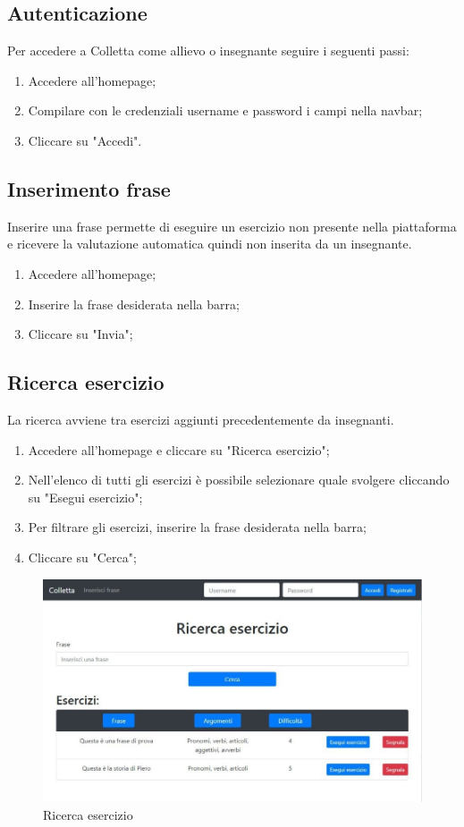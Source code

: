 \documentclass[11pt,a4paper]{article}
\begin{document}
{	\subsection{Autenticazione}
	Per accedere a Colletta come allievo o insegnante seguire i seguenti passi:
	\begin{enumerate}
		\item Accedere all'homepage;
		\item Compilare con le credenziali username e password i campi nella navbar;
		\item Cliccare su "Accedi".
	\end{enumerate}

	\subsection{Inserimento frase}
	Inserire una frase permette di eseguire un esercizio non presente nella piattaforma e ricevere la valutazione automatica quindi non inserita da un insegnante.	
	\begin{enumerate}
		\item Accedere all'homepage;
		\item Inserire la frase desiderata nella barra;
		\item Cliccare su "Invia";
	\end{enumerate}

	\subsection{Ricerca esercizio}
	La ricerca avviene tra esercizi aggiunti precedentemente da insegnanti. 
	
	\begin{enumerate}
		\item Accedere all'homepage e cliccare su "Ricerca esercizio";
		\item Nell'elenco di tutti gli esercizi è possibile selezionare quale svolgere cliccando su "Esegui esercizio";
		\item Per filtrare gli esercizi, inserire la frase desiderata nella barra;
		\item Cliccare su "Cerca";
	\end{enumerate}
	
	\begin{figure}[h]
		\centering
		\includegraphics[scale=0.65]{images/ricerca.jpg}
		\caption{Ricerca esercizio}
	\end{figure}
	
}
\end{document}

